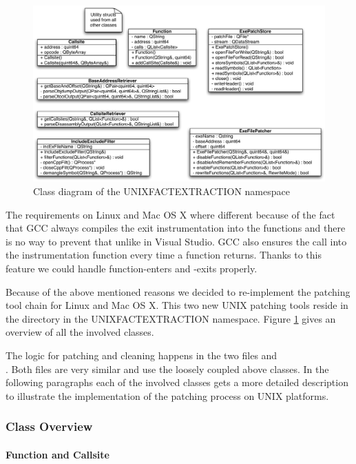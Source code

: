 \begin{figure}[ht]
\centering
\includegraphics[width=16cm]{images/unixpatchtools}
\caption{Class diagram of the UNIXFACTEXTRACTION namespace} \label{fig:unixfe_unixfe}
\end{figure}

The requirements on Linux and Mac OS X where different because of the fact that GCC always compiles the exit instrumentation into the functions and there is no way to prevent that unlike in Visual Studio.  GCC also ensures the call into the instrumentation function every time a function returns.  Thanks to this feature we could handle function-enters and -exits properly.

Because of the above mentioned reasons we decided to re-implement the patching tool chain for Linux and Mac OS X.  This two new UNIX patching tools reside in the  directory in the UNIXFACTEXTRACTION namespace.  Figure \ref{fig:unixfe_unixfe} gives an overview of all the involved classes.

The logic for patching and cleaning happens in the two files  and\\.  Both files are very similar and use the loosely coupled above classes.  In the following paragraphs each of the involved classes gets a more detailed description to illustrate the implementation of the patching process on UNIX platforms.

\subsubsection{Class Overview}

\paragraph{Function and Callsite}

